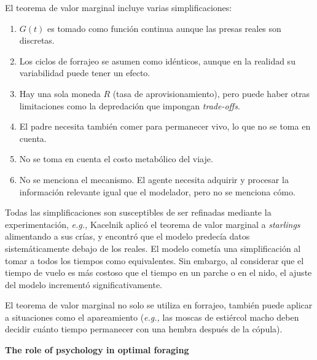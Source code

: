 \documentclass[a4paper,12pt]{article}
\begin{document}
El teorema de valor marginal incluye varias simplificaciones:

\begin{enumerate}
	\item $G(t)$ es tomado como función continua aunque las presas reales son discretas.
	\item Los ciclos de forrajeo se asumen como idénticos, aunque en la realidad su variabilidad puede tener un efecto.
	\item Hay una sola moneda $R$ (tasa de aprovisionamiento), pero puede haber otras limitaciones como la depredación que impongan {\itshape trade-offs}.
	\item El padre necesita también comer para permanecer vivo, lo que no se toma en cuenta.
	\item No se toma en cuenta el costo metabólico del viaje.
	\item No se menciona el mecanismo. El agente necesita adquirir y procesar la información relevante igual que el modelador, pero no se menciona cómo.
\end{enumerate}

Todas las simplificaciones son susceptibles de ser refinadas mediante la experimentación, {\itshape e.g.,} Kacelnik aplicó el teorema de valor marginal a {\itshape starlings} alimentando a sus crías, y encontró que el modelo predecía datos sistemáticamente debajo de los reales. El modelo cometía una simplificación al tomar a todos los tiempos como equivalentes. Sin embargo, al considerar que el tiempo de vuelo es más costoso que el tiempo en un parche o en el nido, el ajuste del modelo incrementó significativamente.

El teorema de valor marginal no solo se utiliza en forrajeo, también puede aplicar a situaciones como el apareamiento ({\itshape e.g.,} las moscas de estiércol macho deben decidir cuánto tiempo permanecer con una hembra después de la cópula).

{\bfseries The role of psychology in optimal foraging}
\end{document}

